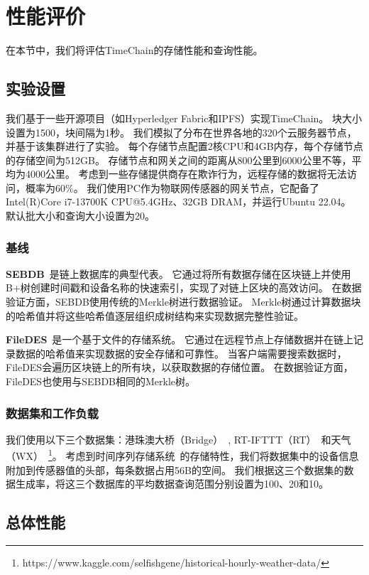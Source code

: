 \chapter{性能评价}
在本节中，我们将评估TimeChain的存储性能和查询性能。

\section{实验设置}
我们基于一些开源项目（如Hyperledger Fabric和IPFS）实现TimeChain。
块大小设置为1500，块间隔为1秒。
我们模拟了分布在世界各地的320个云服务器节点，并基于该集群进行了实验。
每个存储节点配置2核CPU和4GB内存，每个存储节点的存储空间为512GB。
存储节点和网关之间的距离从800公里到6000公里不等，平均为4000公里。
考虑到一些存储提供商存在欺诈行为，远程存储的数据将无法访问，概率为60\%。
我们使用PC作为物联网传感器的网关节点，它配备了Intel(R)Core i7-13700K CPU@5.4GHz、32GB DRAM，并运行Ubuntu 22.04。
默认批大小和查询大小设置为20。

\subsection{基线}
\textbf{SEBDB}~\cite{zhu2019sebdb}是链上数据库的典型代表。
它通过将所有数据存储在区块链上并使用B+树创建时间戳和设备名称的快速索引，实现了对链上区块的高效访问。
在数据验证方面，SEBDB使用传统的Merkle树进行数据验证。
Merkle树通过计算数据块的哈希值并将这些哈希值逐层组织成树结构来实现数据完整性验证。

\textbf{FileDES}~\cite{xu2024filedes}是一个基于文件的存储系统。
它通过在远程节点上存储数据并在链上记录数据的哈希值来实现数据的安全存储和可靠性。
当客户端需要搜索数据时，FileDES会遍历区块链上的所有块，以获取数据的存储位置。
在数据验证方面，FileDES也使用与SEBDB相同的Merkle树。

\subsection{数据集和工作负载}
我们使用以下三个数据集：港珠澳大桥（Bridge）~\cite{zhang2023edge}, RT-IFTTT（RT）~\cite{heo2017rt}和天气（WX）~\footnote{https://www.kaggle.com/selfishgene/historical-hourly-weather-data/}。
考虑到时间序列存储系统~\cite{naqvi2017time}的存储特性，我们将数据集中的设备信息附加到传感器值的头部，每条数据占用56B的空间。
我们根据这三个数据集的数据生成率，将这三个数据库的平均数据查询范围分别设置为100、20和10。

\section{总体性能}

